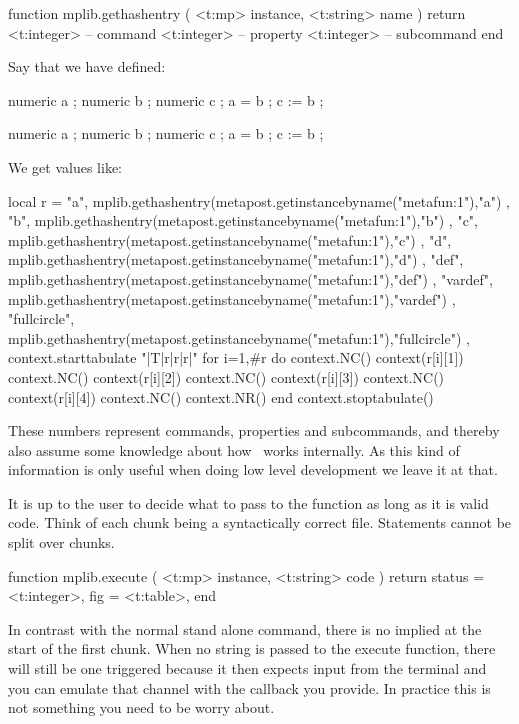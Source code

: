 \starttyping[option=LUA]
function mplib.gethashentry ( <t:mp> instance, <t:string> name )
    return
        <t:integer> -- command
        <t:integer> -- property
        <t:integer> -- subcommand
end
\stoptyping

Say that we have defined:

\starttyping[option=MP]
numeric a ; numeric b ; numeric c ; a = b ; c := b ;
\stoptyping

\startMPcalculation
    numeric a ; numeric b ; numeric c ; a = b ; c := b ;
\stopMPcalculation

We get values like:

\startluacode
local r = {
    { "a",          mplib.gethashentry(metapost.getinstancebyname("metafun:1"),"a") },
    { "b",          mplib.gethashentry(metapost.getinstancebyname("metafun:1"),"b") },
    { "c",          mplib.gethashentry(metapost.getinstancebyname("metafun:1"),"c") },
    { "d",          mplib.gethashentry(metapost.getinstancebyname("metafun:1"),"d") },
    { "def",        mplib.gethashentry(metapost.getinstancebyname("metafun:1"),"def") },
    { "vardef",     mplib.gethashentry(metapost.getinstancebyname("metafun:1"),"vardef") },
    { "fullcircle", mplib.gethashentry(metapost.getinstancebyname("metafun:1"),"fullcircle") },
}
context.starttabulate { "|T|r|r|r|" }
for i=1,#r do
    context.NC() context(r[i][1])
    context.NC() context(r[i][2])
    context.NC() context(r[i][3])
    context.NC() context(r[i][4])
    context.NC() context.NR()
end
context.stoptabulate()
\stopluacode

These numbers represent commands, properties and subcommands, and thereby also
assume some knowledge about how \METAPOST\ works internally. As this kind of
information is only useful when doing low level development we leave it at that.

\stopsection

\startsection[title=Processing]

It is up to the user to decide what to pass to the  function as
long as it is valid code. Think of each chunk being a syntactically correct file.
Statements cannot be split over chunks.

\starttyping[option=LUA]
function mplib.execute ( <t:mp> instance, <t:string> code )
    return {
        status = <t:integer>,
        fig    = <t:table>,
    }
end
\stoptyping

In contrast with the normal stand alone  command, there is no
implied  at the start of the first chunk. When no string is passed
to the execute function, there will still be one triggered because it then
expects input from the terminal and you can emulate that channel with the
callback you provide. In practice this is not something you need to be worry
about.

